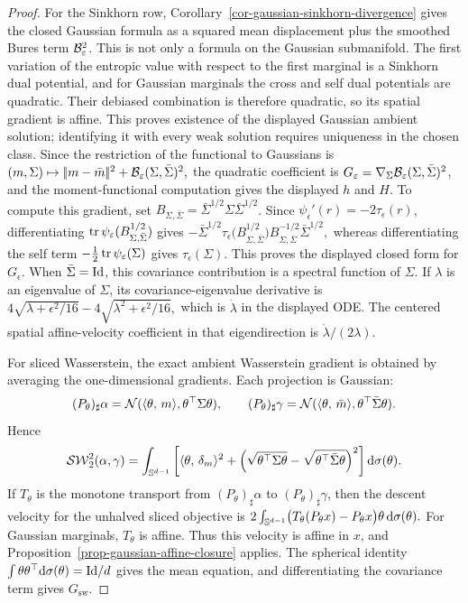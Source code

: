 \begin{proof}
For the Sinkhorn row, Corollary~\ref{cor-gaussian-sinkhorn-divergence} gives the closed Gaussian formula as a squared mean displacement plus the smoothed Bures term \(\mathcal{B}_\varepsilon^2\). This is not only a formula on the Gaussian submanifold. The first variation of the entropic value with respect to the first marginal is a Sinkhorn dual potential, and for Gaussian marginals the cross and self dual potentials are quadratic. Their debiased combination is therefore quadratic, so its spatial gradient is affine. This proves existence of the displayed Gaussian ambient solution; identifying it with every weak solution requires uniqueness in the chosen class. Since the restriction of the functional to Gaussians is
\((m,\Sigma)\mapsto |\!| m-\bar m |\!|^2+\mathcal{B}_\varepsilon(\Sigma,\bar\Sigma)^2,\)
the quadratic coefficient is \(G_\varepsilon=\nabla_\Sigma\mathcal{B}_\varepsilon(\Sigma,\bar\Sigma)^2\), and the moment-functional computation gives the displayed \(h\) and \(H\). To compute this gradient, set \(B_{\Sigma,\bar\Sigma}=\bar\Sigma^{1/2}\Sigma\bar\Sigma^{1/2}\). Since \(\psi_\epsilon'(r)=-2\tau_\epsilon(r)\), differentiating
\(\operatorname{tr}\psi_\varepsilon(B_{\Sigma,\bar\Sigma}^{1/2})\) gives
\(-\bar\Sigma^{1/2} \tau_\epsilon\bigl(B_{\Sigma,\bar\Sigma}^{1/2}\bigr) B_{\Sigma,\bar\Sigma}^{-1/2} \bar\Sigma^{1/2},\)
whereas differentiating the self term
\(-\frac12\operatorname{tr}\psi_\varepsilon(\Sigma)\) gives \(\tau_\epsilon(\Sigma)\). This proves the displayed closed form for \(G_\epsilon\). When \(\bar\Sigma=\mathrm{Id}\), this covariance contribution is a spectral function of \(\Sigma\). If \(\lambda\) is an eigenvalue of \(\Sigma\), its covariance-eigenvalue derivative is
\(4\sqrt{\lambda+\epsilon^2/16}-4\sqrt{\lambda^2+\epsilon^2/16},\)
which is \(\dot\lambda\) in the displayed ODE. The centered spatial affine-velocity coefficient in that eigendirection is \(\dot\lambda/(2\lambda)\).

For sliced Wasserstein, the exact ambient Wasserstein gradient is obtained by averaging the one-dimensional gradients. Each projection is Gaussian:
\[
(P_\theta)_\sharp\alpha=\mathcal{N}(\langle \theta,\,m\rangle,\theta^\top\Sigma\theta),
\qquad
(P_\theta)_\sharp\gamma=\mathcal{N}(\langle \theta,\,\bar m\rangle,\theta^\top\bar\Sigma\theta).
\]
Hence
\[
\operatorname{\mathcal{SW}}_2^2(\alpha,\gamma)
=
\int_{\mathbb{S}^{d-1}}
\left[
\langle \theta,\,\delta_m\rangle^2
+
\left(\sqrt{\theta^\top\Sigma\theta}
-\sqrt{\theta^\top\bar\Sigma\theta}\right)^2
\right]\mathrm{d}\sigma(\theta).
\]
If \(T_\theta\) is the monotone transport from \((P_\theta)_\sharp\alpha\) to \((P_\theta)_\sharp\gamma\), then the descent velocity for the unhalved sliced objective is
\(2\int_{\mathbb{S}^{d-1}}\bigl(T_\theta(P_\theta x)-P_\theta x\bigr)\theta\,\mathrm{d}\sigma(\theta).\)
For Gaussian marginals, \(T_\theta\) is affine. Thus this velocity is affine in \(x\), and Proposition~\ref{prop-gaussian-affine-closure} applies. The spherical identity \(\int\theta\theta^\top\mathrm{d}\sigma(\theta)=\mathrm{Id}/d\) gives the mean equation, and differentiating the covariance term gives \(G_{\mathrm{sw}}\).
\end{proof}

